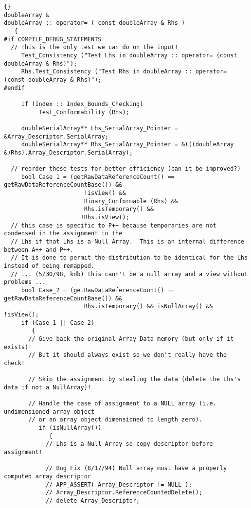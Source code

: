 \documentclass[10pt]{llncs}
\begin{document}
\begin{lstlisting}{}
doubleArray &
doubleArray :: operator= ( const doubleArray & Rhs )
   {
#if COMPILE_DEBUG_STATEMENTS
  // This is the only test we can do on the input!
     Test_Consistency ("Test Lhs in doubleArray :: operator= (const doubleArray & Rhs)");
     Rhs.Test_Consistency ("Test Rhs in doubleArray :: operator= (const doubleArray & Rhs)");
#endif

     if (Index :: Index_Bounds_Checking)
          Test_Conformability (Rhs);

     doubleSerialArray** Lhs_SerialArray_Pointer = &Array_Descriptor.SerialArray;
     doubleSerialArray** Rhs_SerialArray_Pointer = &(((doubleArray &)Rhs).Array_Descriptor.SerialArray);

  // reorder these tests for better efficiency (can it be improved?)
     bool Case_1 = (getRawDataReferenceCount() == getRawDataReferenceCountBase()) &&
                       !isView() &&
                       Binary_Conformable (Rhs) &&
                       Rhs.isTemporary() &&
                      !Rhs.isView();
  // this case is specific to P++ because temporaries are not condensed in the assignment to the
  // Lhs if that Lhs is a Null Array.  This is an internal difference between A++ and P++.
  // It is done to permit the distribution to be identical for the Lhs instead of being remapped.
  // ... (5/30/98, kdb) this cann't be a null array and a view without problems ...
     bool Case_2 = (getRawDataReferenceCount() == getRawDataReferenceCountBase()) && 
                       Rhs.isTemporary() && isNullArray() && !isView(); 
     if (Case_1 || Case_2)
        {
       // Give back the original Array_Data memory (but only if it exists)!
       // But it should always exist so we don't really have the check!

       // Skip the assignment by stealing the data (delete the Lhs's data if not a NullArray)!

       // Handle the case of assignment to a NULL array (i.e. undimensioned array object
       // or an array object dimensioned to length zero).
          if (isNullArray())
             {
            // Lhs is a Null Array so copy descriptor before assignment!

            // Bug Fix (8/17/94) Null array must have a properly computed array descriptor
            // APP_ASSERT( Array_Descriptor != NULL );
            // Array_Descriptor.ReferenceCountedDelete();
            // delete Array_Descriptor;


\end{lstlisting}
\end{document}
